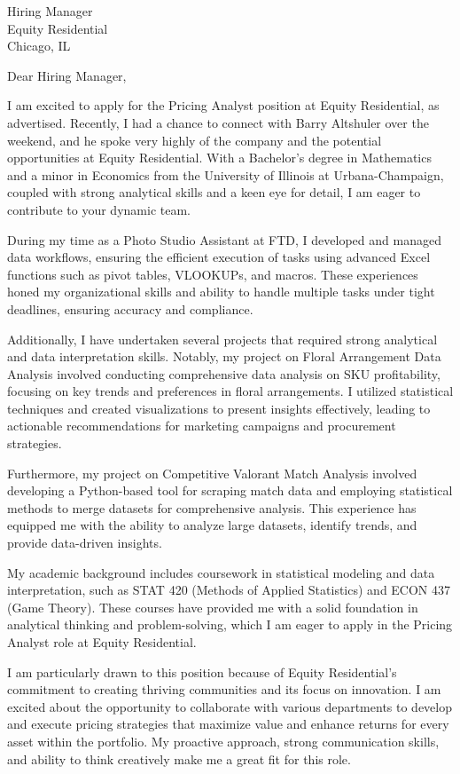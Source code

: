 \documentclass{letter}
\begin{document}
\begin{letter}{Hiring Manager\\Equity Residential\\Chicago, IL}

\opening{Dear Hiring Manager,}

I am excited to apply for the Pricing Analyst position at Equity Residential, as advertised. Recently, I had a chance to connect with Barry Altshuler over the weekend, and he spoke very highly of the company and the potential opportunities at Equity Residential. With a Bachelor's degree in Mathematics and a minor in Economics from the University of Illinois at Urbana-Champaign, coupled with strong analytical skills and a keen eye for detail, I am eager to contribute to your dynamic team.

During my time as a Photo Studio Assistant at FTD, I developed and managed data workflows, ensuring the efficient execution of tasks using advanced Excel functions such as pivot tables, VLOOKUPs, and macros. These experiences honed my organizational skills and ability to handle multiple tasks under tight deadlines, ensuring accuracy and compliance.

Additionally, I have undertaken several projects that required strong analytical and data interpretation skills. Notably, my project on Floral Arrangement Data Analysis involved conducting comprehensive data analysis on SKU profitability, focusing on key trends and preferences in floral arrangements. I utilized statistical techniques and created visualizations to present insights effectively, leading to actionable recommendations for marketing campaigns and procurement strategies.

Furthermore, my project on Competitive Valorant Match Analysis involved developing a Python-based tool for scraping match data and employing statistical methods to merge datasets for comprehensive analysis. This experience has equipped me with the ability to analyze large datasets, identify trends, and provide data-driven insights.

My academic background includes coursework in statistical modeling and data interpretation, such as STAT 420 (Methods of Applied Statistics) and ECON 437 (Game Theory). These courses have provided me with a solid foundation in analytical thinking and problem-solving, which I am eager to apply in the Pricing Analyst role at Equity Residential.

I am particularly drawn to this position because of Equity Residential's commitment to creating thriving communities and its focus on innovation. I am excited about the opportunity to collaborate with various departments to develop and execute pricing strategies that maximize value and enhance returns for every asset within the portfolio. My proactive approach, strong communication skills, and ability to think creatively make me a great fit for this role.


\end{letter}
\end{document}
